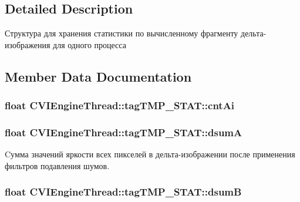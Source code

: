 \subsection{Detailed Description}
Структура для хранения статистики по вычисленному фрагменту дельта-\/изображения для одного процесса 



\subsection{Member Data Documentation}
\hypertarget{struct_c_v_i_engine_thread_1_1tag_t_m_p___s_t_a_t_ad5c691a4f5a4dca0c461909bd5dd27a7}{
\subsubsection[{cnt\+Ai}]{\setlength{\rightskip}{0pt plus 5cm}float C\+V\+I\+Engine\+Thread\+::tag\+T\+M\+P\+\_\+\+S\+T\+A\+T\+::cnt\+Ai}}\label{struct_c_v_i_engine_thread_1_1tag_t_m_p___s_t_a_t_ad5c691a4f5a4dca0c461909bd5dd27a7}




\hypertarget{struct_c_v_i_engine_thread_1_1tag_t_m_p___s_t_a_t_a23e5c889258c787d09e9176b8f6d670c}{
\subsubsection[{dsum\+A}]{\setlength{\rightskip}{0pt plus 5cm}float C\+V\+I\+Engine\+Thread\+::tag\+T\+M\+P\+\_\+\+S\+T\+A\+T\+::dsum\+A}}\label{struct_c_v_i_engine_thread_1_1tag_t_m_p___s_t_a_t_a23e5c889258c787d09e9176b8f6d670c}


Cумма значений яркости всех пикселей в дельта-\/изображении после применения фильтров подавления шумов. 

\hypertarget{struct_c_v_i_engine_thread_1_1tag_t_m_p___s_t_a_t_ae754be6a110348618402ce40f495a3a2}{
\subsubsection[{dsum\+B}]{\setlength{\rightskip}{0pt plus 5cm}float C\+V\+I\+Engine\+Thread\+::tag\+T\+M\+P\+\_\+\+S\+T\+A\+T\+::dsum\+B}}\label{struct_c_v_i_engine_thread_1_1tag_t_m_p___s_t_a_t_ae754be6a110348618402ce40f495a3a2}


